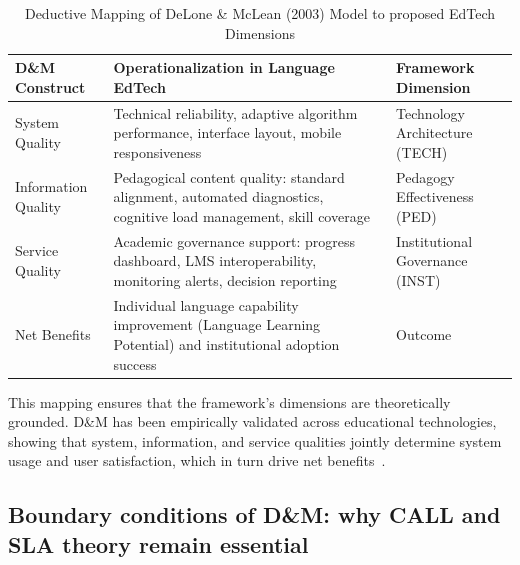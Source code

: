 \documentclass[11pt,a4paper]{article}
\begin{document}
\begin{table}[ht]
  \caption{Deductive Mapping of DeLone \& McLean (2003) Model to proposed EdTech Dimensions}
  \label{tab:dm_mapping}
  \centering
  \renewcommand{\arraystretch}{1.3}
  \begin{tabular}{@{} L{3.5cm} L{6.0cm} L{4.5cm} @{} }
    \toprule
    \textbf{D\&M Construct} & \textbf{Operationalization in Language EdTech} & \textbf{Framework Dimension} \\
    \midrule
    System Quality & Technical reliability, adaptive algorithm performance, interface layout, mobile responsiveness & Technology Architecture (TECH) \\
    Information Quality & Pedagogical content quality: standard alignment, automated diagnostics, cognitive load management, skill coverage & Pedagogy Effectiveness (PED) \\
    Service Quality & Academic governance support: progress dashboard, LMS interoperability, monitoring alerts, decision reporting & Institutional Governance (INST) \\
    Net Benefits & Individual language capability improvement (Language Learning Potential) and institutional adoption success & Outcome \\
    \bottomrule
  \end{tabular}
\end{table}

This mapping ensures that the framework's dimensions are theoretically grounded. D\&M has been empirically validated across educational technologies, showing that system, information, and service qualities jointly determine system usage and user satisfaction, which in turn drive net benefits~\cite{b32}.

\subsection{Boundary conditions of D\&M: why CALL and SLA theory remain essential}
\end{document}
